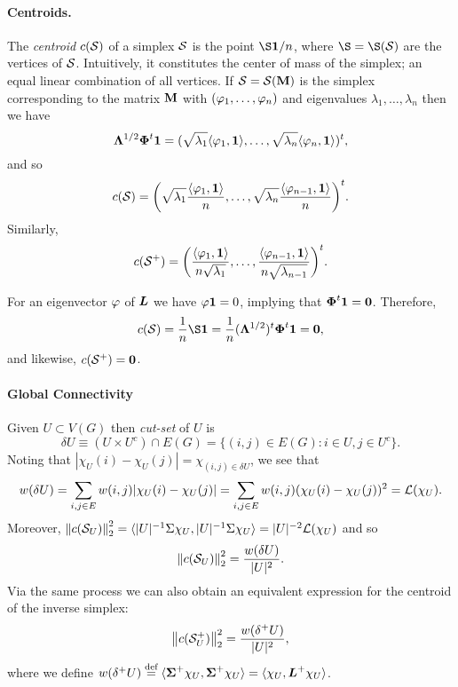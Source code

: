 \paragraph{Centroids.}
The \emph{centroid} $c(\mathcal{S})$ of a simplex $\mathcal{S}$ is the point $\S\one/n$, where $\S=\S(\splx)$ are the vertices of $\mathcal{S}$. Intuitively, it constitutes the center of mass of the simplex; an equal linear combination of all vertices. If $\mathcal{S}=\mathcal{S}(\vb{M})$ is the simplex corresponding to the matrix $\vb{M}$ with  $(\varphi_1,\dots,\varphi_n)$ and eigenvalues $\lambda_1,\dots,\lambda_n$ then we have
\[\vb{\Lambda}^{1/2}\boldsymbol{\Phi}^t\vb{1} = (\sqrt{\lambda_1}\langle \varphi_1,\vb{1}\rangle , \dots, \sqrt{\lambda_{n}}\langle \varphi_{n},\vb{1}\rangle)^t ,\]
and so 
\[c(\mathcal{S}) = \bigg(\sqrt{\lambda_1}\frac{\langle \varphi_1,\vb{1}\rangle}{n }, \dots, \sqrt{\lambda_{n}}\frac{\langle \varphi_{n-1},\vb{1}\rangle}{n}\bigg)^t. \]
Similarly, 
\[c(\mathcal{S}^+) = \bigg(\frac{\langle \varphi_1,\vb{1}\rangle}{n\sqrt{\lambda_1} }, \dots, \frac{\langle \varphi_{n-1},\vb{1}\rangle}{n\sqrt{\lambda_{n-1}}}\bigg)^t.\]

For an eigenvector $\varphi$ of $\vb*{L}$ we have $\varphi\vb{1}=0$, implying that $\boldsymbol{\Phi}^t\vb{1}=\vb{0}$. Therefore, 
\[c(\splx) = \frac{1}{n}\S\one = \frac{1}{n}(\Eval^{1/2})^\tp \Eig^\tp \one = \zero, \]
and likewise, $c(\mathcal{S}^+)=\vb{0}$.

\paragraph{Global Connectivity}
Given $U\subset V(G)$ then \emph{cut-set} of $U$ is 
\[\delta U \equiv (U\times U^c)\cap E(G)= \{(i,j)\in E(G): i\in U, j\in U^c\}.\]
Noting that $|\chi_U(i)-\chi_U(j)|=\chi_{(i,j)\in \delta U}$, we see that
\begin{align*}
    w(\delta U) = \sum_{i,j\in E} w(i,j)|\chi_U(i)-\chi_U(j)| = \sum_{i,j\in E} w(i,j)(\chi_U(i)-\chi_U(j))^2 = \mathcal{L}(\chi_U). 
\end{align*}
Moreover, $\norm{c(\mathcal{S}_U)}^2_2 = \langle |U|^{-1} \Sigma\chi_U,|U|^{-1} \Sigma\chi_U\rangle = |U|^{-2} \mathcal{L}(\chi_U)$ and so 
\begin{equation}
\label{eq:c(S_U)}
    \norm{c(\mathcal{S}_U)}_2^2 = \frac{w(\delta U)}{|U|^2}.
\end{equation}
Via the same process we can also obtain an equivalent expression for the centroid of the inverse simplex: 
\begin{equation}
\label{eq:c(S+_U)}
    \norm{c(\mathcal{S}^+_U)}_2^2 = \frac{w(\delta^+ U)}{|U|^2},
\end{equation}
where we define $w(\delta^+U) \overset{\text{def}}{=}  \langle \boldsymbol{\Sigma}^+\chi_U,\boldsymbol{\Sigma}^+\chi_U\rangle=\langle \chi_U,\vb*{L}^+\chi_U\rangle$. 

